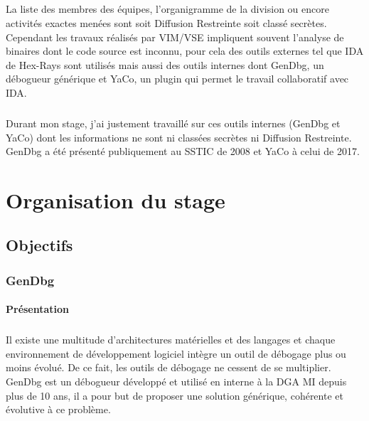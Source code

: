 \documentclass[11pt, book, english, french, standardlists]{upmethodology-document}
\begin{document}
				\paragraph*{}
					La liste des membres des équipes, l'organigramme de la division ou encore activités exactes menées sont soit Diffusion Restreinte soit classé secrètes. Cependant les travaux réalisés par \gls{VIM/VSE} impliquent souvent l'analyse de binaires dont le code source est inconnu, pour cela des outils externes tel que IDA de Hex-Rays sont utilisés mais aussi des outils internes dont GenDbg, un débogueur générique et YaCo, un plugin qui permet le travail collaboratif avec IDA.
				\paragraph*{}
					Durant mon stage, j'ai justement travaillé sur ces outils internes (GenDbg et YaCo) dont les informations ne sont ni classées secrètes ni Diffusion Restreinte. GenDbg a été présenté publiquement au \gls{SSTIC} de 2008\cite{SSTICGenDbg} et YaCo à celui de 2017\cite{SSTICYaCo}. %
	\chapter{Organisation du stage}
		\section{Objectifs}
			\subsection{GenDbg}
				\subsubsection{Présentation}
					\paragraph*{}
						Il existe une multitude d'architectures matérielles et des langages et chaque environnement de développement logiciel intègre un outil de débogage plus ou moins évolué. De ce fait, les outils de débogage ne cessent de se multiplier. GenDbg est un débogueur développé et utilisé en interne à la \gls{DGA MI} depuis plus de 10 ans, il a pour but de proposer une solution générique, cohérente et évolutive à ce problème.
\end{document}
